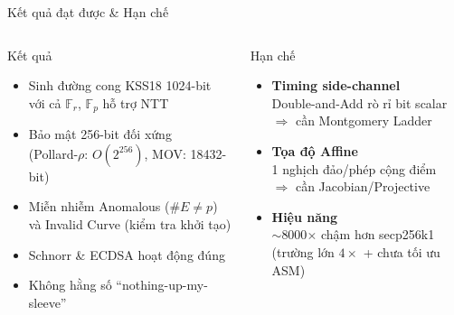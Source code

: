 \begin{frame}[label=sec4]{Kết quả đạt được \& Hạn chế}
  \begin{columns}[t]
      \begin{block}{Kết quả}
        \begin{itemize}
          \item[$\checkmark$] Sinh đường cong KSS18 1024-bit\\
                với cả $\mathbb{F}_r$, $\mathbb{F}_p$ hỗ trợ NTT
          \item[$\checkmark$] Bảo mật 256-bit đối xứng\\
                (Pollard-$\rho$: $O(2^{256})$, MOV: 18432-bit)
          \item[$\checkmark$] Miễn nhiễm Anomalous ($\#E \neq p$)\\
                và Invalid Curve (kiểm tra khởi tạo)
          \item[$\checkmark$] Schnorr \& ECDSA hoạt động đúng
          \item[$\checkmark$] Không hằng số ``nothing-up-my-sleeve''
        \end{itemize}
      \end{block}
      \begin{alertblock}{Hạn chế}
        \begin{itemize}
          \item \textbf{Timing side-channel}\\
                Double-and-Add rò rỉ bit scalar\\
                $\Rightarrow$ cần Montgomery Ladder
          \item \textbf{Tọa độ Affine}\\
                1 nghịch đảo/phép cộng điểm\\
                $\Rightarrow$ cần Jacobian/Projective
          \item \textbf{Hiệu năng}\\
                $\sim$8000$\times$ chậm hơn secp256k1\\
                (trường lớn $4\times$ + chưa tối ưu ASM)
        \end{itemize}
      \end{alertblock}
  \end{columns}
\end{frame}
